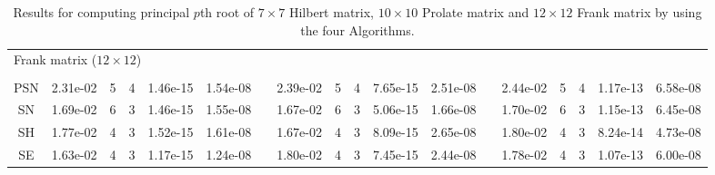 \begin{landscape}
\begin{table}
\begin{center}
\begin{tabular}{cccccccccccccccccc}
 \\
\multicolumn{6}{l}{Frank matrix ($12 \times 12$)}\\
 \\
PSN & 2.31e-02 & 5 & 4 & 1.46e-15 & 1.54e-08 & & 2.39e-02 & 5 & 4 & 7.65e-15 & 2.51e-08 && 2.44e-02 & 5 & 4 & 1.17e-13 & 6.58e-08\\
SN & 1.69e-02 & 6 & 3 & 1.46e-15 & 1.55e-08 & & 1.67e-02 & 6 & 3 & 5.06e-15 & 1.66e-08 && 1.70e-02 & 6 & 3 & 1.15e-13 & 6.45e-08\\
SH & 1.77e-02 & 4 & 3 & 1.52e-15 & 1.61e-08 & & 1.67e-02 & 4 & 3 & 8.09e-15 & 2.65e-08 && 1.80e-02 & 4 & 3 & 8.24e-14 & 4.73e-08\\
SE & 1.63e-02 & 4 & 3 & 1.17e-15 & 1.24e-08 & & 1.80e-02 & 4 & 3 & 7.45e-15 & 2.44e-08 && 1.78e-02 & 4 & 3 & 1.07e-13 & 6.00e-08\\
\hline
\end{tabular}
\end{center}
\caption{Results for computing principal $p$th root of $7 \times 7$
Hilbert matrix, $10 \times 10$ Prolate matrix and $12 \times 12$
Frank matrix by using the four Algorithms. }
\label{tab:relres_err_it}
\end{table}
\end{landscape}

